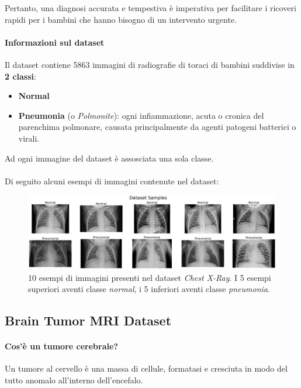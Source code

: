         Pertanto, una diagnosi accurata e tempestiva è imperativa per facilitare i ricoveri rapidi per i bambini che hanno bisogno di un intervento urgente. 
        
        \paragraph{Informazioni sul dataset}
        Il dataset \cite{Chest_X_Ray_Dataset} contiene 5863 immagini di radiografie di toraci di bambini suddivise in \textbf{2 classi}:
            \begin{itemize}
                \item \textbf{Normal}
                \item \textbf{Pneumonia} (o \textit{Polmonite}): ogni infiammazione, acuta o cronica del parenchima polmonare, causata principalmente da agenti patogeni batterici o virali.
            \end{itemize}
        
        Ad ogni immagine del dataset è assosciata una sola classe.\\\\
        Di seguito alcuni esempi di immagini contenute nel dataset:
            \begin{figure}[!ht]
                \centering
                \includegraphics[width=\textwidth]{Images/Datasets/Pneumonia Dataset Samples.png}
                \caption{10 esempi di immagini presenti nel dataset \textit{Chest X-Ray}. I 5 esempi superiori aventi classe \textit{normal}, i 5 inferiori aventi classe \textit{pneumonia}.}
                \label{Pneumonia Samples}
            \end{figure}
    \newpage
    
    \subsection{Brain Tumor MRI Dataset}
    
        \paragraph{Cos'è un tumore cerebrale?}
        Un tumore al cervello è una massa di cellule, formatasi e cresciuta in modo del tutto anomalo all'interno dell'encefalo.
        
